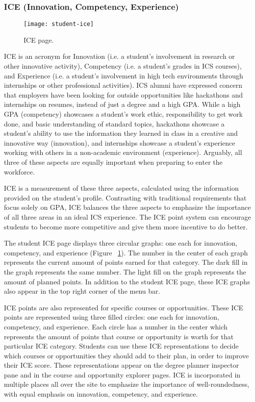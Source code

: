 \subsubsection{ICE (Innovation, Competency, Experience)}
\begin{figure}[htbp!]
\centering
\texttt{[image: student-ice]}
\caption{ICE page.}
\label{ice}
\end{figure}
ICE is an acronym for Innovation (i.e. a student's involvement in research or other innovative activity), Competency (i.e. a student's grades in ICS courses), and Experience (i.e. a student's involvement in high tech environments through internships or other professional activities). ICS alumni have expressed concern that employers have been looking for outside opportunities like hackathons and internships on resumes, instead of just a degree and a high GPA. While a high GPA (competency) showcases a student's work ethic, responsibility to get work done, and basic understanding of standard topics, hackathons showcase a student's ability to use the information they learned in class in a creative and innovative way (innovation), and internships showcase a student's experience working with others in a non-academic environment (experience). Arguably, all three of these aspects are equally important when preparing to enter the workforce.

ICE is a measurement of these three aspects, calculated using the information provided on the student's profile. Contrasting with traditional requirements that focus solely on GPA, ICE balances the three aspects to emphasize the importance of all three areas in an ideal ICS experience. The ICE point system can encourage students to become more competitive and give them more incentive to do better.

The student ICE page displays three circular graphs: one each for innovation, competency, and experience (Figure ~\ref{ice}). The number in the center of each graph represents the current amount of points earned for that category. The dark fill in the graph represents the same number. The light fill on the graph represents the amount of planned points. In addition to the student ICE page, these ICE graphs also appear in the top right corner of the menu bar. 

ICE points are also represented for specific courses or opportunities. These ICE points are represented using three filled circles: one each for innovation, competency, and experience. Each circle has a number in the center which represents the amount of points that course or opportunity is worth for that particular ICE category. Students can use these ICE representations to decide which courses or opportunities they should add to their plan, in order to improve their ICE score. These representations appear on the degree planner inspector pane and in the course and opportunity explorer pages. ICE is incorporated in multiple places all over the site to emphasize the importance of well-roundedness, with equal emphasis on innovation, competency, and experience.

